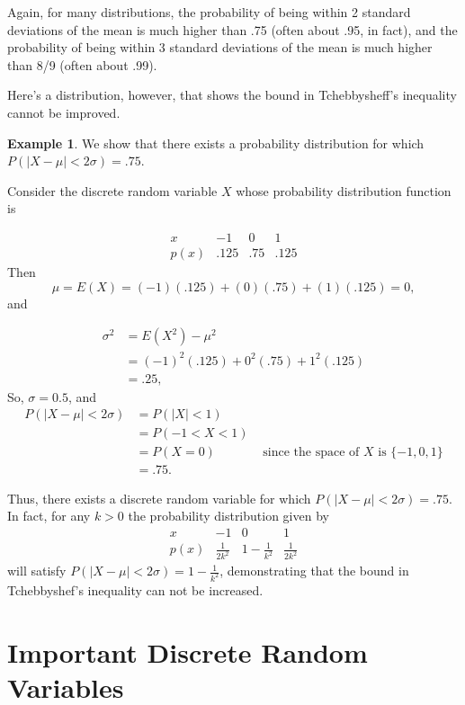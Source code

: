 \documentclass[
]{book}
\theoremstyle{definition}
\theoremstyle{definition}
\newtheorem{example}{Example}[chapter]
\theoremstyle{definition}
\theoremstyle{definition}
\theoremstyle{remark}
\begin{document}
Again, for many distributions, the probability of being within 2 standard deviations of the mean is much higher than .75 (often about .95, in fact), and the probability of being within 3 standard deviations of the mean is much higher than 8/9 (often about .99).

Here's a distribution, however, that shows the bound in Tchebbysheff's inequality cannot be improved.

\begin{example}
\protect\hypertarget{exm:tchebby-best-bound}{}\label{exm:tchebby-best-bound}We show that there exists a probability distribution for which \(P(|X-\mu|<2\sigma) = .75\).

Consider the discrete random variable \(X\) whose probability distribution function is

\[
\begin{array}{c|c|c|c}
x   &  -1 &  0 &  1   \\ \hline
p(x) & .125 & .75 & .125 
\end{array}
\]
Then \[\mu = E(X) = (-1)(.125) + (0)(.75) + (1)(.125) = 0,\] and

\begin{align*}
\sigma^2 &= E(X^2)-\mu^2 \\
  &= (-1)^2(.125) + 0^2(.75) + 1^2(.125)\\
  &=.25,
\end{align*}
So, \(\sigma = 0.5\), and
\begin{align*}
P(|X - \mu| < 2 \sigma) &= P(|X| < 1) \\
&= P(-1 < X < 1) \\
&= P(X = 0) & \text{ since the space of $X$ is } \{-1,0,1\} \\
&= .75.
\end{align*}

Thus, there exists a discrete random variable for which \(P(|X - \mu| < 2 \sigma) = .75\). In fact, for any \(k > 0\) the probability distribution given by
\[
\begin{array}{c|c|c|c}
x   &  -1 &  0 &  1   \\ \hline
p(x) & \frac{1}{2k^2} & 1-\frac{1}{k^2} & \frac{1}{2k^2} 
\end{array}
\]
will satisfy \(P(|X-\mu|<2\sigma)=1-\frac{1}{k^2}\), demonstrating that the bound in Tchebbyshef's inequality can not be increased.
\end{example}

\chapter{Important Discrete Random Variables}\label{important-discrete-rv}
\end{document}
